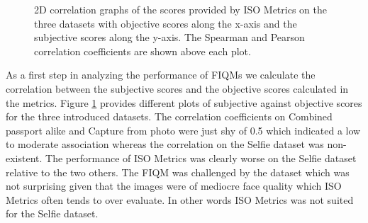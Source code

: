\begin{figure}[h]
    \caption{2D correlation graphs of the scores provided by ISO Metrics on the three datasets with objective scores along the x-axis and the subjective scores along the y-axis. The Spearman and Pearson correlation coefficients are shown above each plot.}
    \label{fig:corrISOsvsSub}
\end{figure}
\noindent 
As a first step in analyzing the performance of FIQMs we calculate the correlation between the subjective scores and the objective scores calculated in the metrics. Figure \ref{fig:corrISOsvsSub} provides different plots of subjective against objective scores for the three introduced datasets. The correlation coefficients on Combined passport alike and Capture from photo were just shy of 0.5 which indicated a low to moderate association whereas the correlation on the Selfie dataset was non-existent. The performance of ISO Metrics was clearly worse on the Selfie dataset relative to the two others. The FIQM was challenged by the dataset which was not surprising given that the images were of mediocre face quality which ISO Metrics often tends to over evaluate. In other words ISO Metrics was not suited for the Selfie dataset.  

